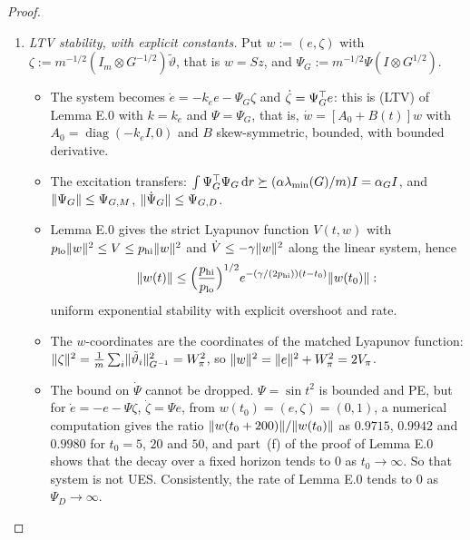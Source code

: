 \begin{proof}
\begin{enumerate}[label=\arabic*.]
  \item \emph{LTV stability, with explicit constants.} Put $w:=(e,\zeta)$ with
    $\zeta:=m^{-1/2}(I_m\otimes G^{-1/2})\tilde\vartheta$, that is $w=Sz$, and $\Psi_G:=m^{-1/2}\Psi(I\otimes G^{1/2})$.
    \begin{itemize}
      \item The system becomes $\dot e=-k_ee-\Psi_G\zeta$ and $\dot\zeta=\Psi_G^\top e$: this is (LTV) of Lemma E.0
        with $k=k_e$ and $\Psi=\Psi_G$, that is, $\dot w=[A_0+B(t)]w$ with $A_0=\operatorname{diag}(-k_eI,0)$ and $B$
        skew-symmetric, bounded, with bounded derivative.
      \item The excitation transfers: $\int\Psi_G^\top\Psi_G\,\mathrm{d} r\succeq(\alpha\lambda_{\min}(G)/m)I=\alpha_GI$, and
        $\lVert \Psi_G\rVert\le\Psi_{G,M}$, $\lVert \dot\Psi_G\rVert\le\Psi_{G,D}$.
      \item Lemma E.0 gives the strict Lyapunov function $V(t,w)$ with
        $p_{\mathrm{lo}}\lVert w\rVert^2\le V\le p_{\mathrm{hi}}\lVert w\rVert^2$ and $\dot V\le-\gamma\lVert w\rVert^2$ along the
        linear system, hence
        \[
          \lVert w(t)\rVert\le\Bigl(\frac{p_{\mathrm{hi}}}{p_{\mathrm{lo}}}\Bigr)^{1/2}
          e^{-(\gamma/(2p_{\mathrm{hi}}))(t-t_0)}\lVert w(t_0)\rVert:
        \]
        uniform exponential stability with explicit overshoot and rate.
      \item The $w$-coordinates are the coordinates of the matched Lyapunov function:
        $\lVert \zeta\rVert^2=\frac1m\sum_i\lVert \tilde\vartheta_i\rVert^2_{G^{-1}}=W_\pi^2$, so
        $\lVert w\rVert^2=\lVert e\rVert^2+W_\pi^2=2V_\pi$.
      \item The bound on $\dot\Psi$ cannot be dropped. $\Psi=\sin t^2$ is bounded and PE, but for
        $\dot e=-e-\Psi\zeta$, $\dot\zeta=\Psi e$, from $w(t_0)=(e,\zeta)=(0,1)$, a numerical computation gives the
        ratio $\lVert w(t_0+200)\rVert/\lVert w(t_0)\rVert$ as $0.9715$, $0.9942$ and $0.9980$ for $t_0=5$, $20$ and $50$, and
        part~(f) of the proof of Lemma E.0 shows that the decay over a fixed horizon tends to $0$ as $t_0\to\infty$.
        So that system is not UES. Consistently, the rate of Lemma E.0 tends to $0$ as $\Psi_D\to\infty$.
    \end{itemize}


\end{enumerate}
\end{proof}
